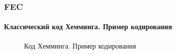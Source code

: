 \begin{frame}
    \frametitle{FEC}
    \framesubtitle{Классический код Хемминга. Пример кодирования}
    
    \begin{figure}
        \begin{center}
            \caption{Код Хемминга. Пример кодирования}\label{pict:hammingEncode}
        \end{center}
    \end{figure}
\end{frame}


